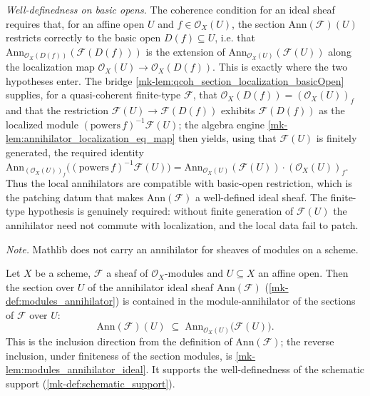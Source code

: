 \begin{definition}
  \emph{Well-definedness on basic opens.} The coherence condition for an ideal
  sheaf requires that, for an affine open \(U\) and \(f \in \mathcal{O}_X(U)\),
  the section \(\mathrm{Ann}(\mathcal{F})(U)\) restricts correctly to the basic
  open \(D(f) \subseteq U\), i.e. that
  \(\mathrm{Ann}_{\mathcal{O}_X(D(f))}(\mathcal{F}(D(f)))\) is the extension of
  \(\mathrm{Ann}_{\mathcal{O}_X(U)}(\mathcal{F}(U))\) along the localization map
  \(\mathcal{O}_X(U) \to \mathcal{O}_X(D(f))\). This is exactly where the two
  hypotheses enter. The bridge
  \ref{mk-lem:qcoh_section_localization_basicOpen} supplies, for a quasi-coherent
  finite-type \(\mathcal{F}\), that \(\mathcal{O}_X(D(f)) = (\mathcal{O}_X(U))_f\)
  and that the restriction \(\mathcal{F}(U) \to \mathcal{F}(D(f))\) exhibits
  \(\mathcal{F}(D(f))\) as the localized module \((\mathrm{powers}\,f)^{-1}
  \mathcal{F}(U)\); the algebra engine
  \ref{mk-lem:annihilator_localization_eq_map} then yields, using that
  \(\mathcal{F}(U)\) is finitely generated, the required identity
  \(\mathrm{Ann}_{(\mathcal{O}_X(U))_f}\bigl((\mathrm{powers}\,f)^{-1}
  \mathcal{F}(U)\bigr) = \mathrm{Ann}_{\mathcal{O}_X(U)}(\mathcal{F}(U)) \cdot
  (\mathcal{O}_X(U))_f\). Thus the local annihilators are compatible with basic-open
  restriction, which is the patching datum that makes \(\mathrm{Ann}(\mathcal{F})\)
  a well-defined ideal sheaf. The finite-type hypothesis is genuinely required:
  without finite generation of \(\mathcal{F}(U)\) the annihilator need not commute
  with localization, and the local data fail to patch.

  \emph{Note.} Mathlib does not carry an annihilator for sheaves of modules on a scheme.
\end{definition}

\begin{lemma}\label{mk-lem:modules_annihilator_ideal_le}
  \leanok

  Let \(X\) be a scheme, \(\mathcal{F}\) a sheaf of \(\mathcal{O}_X\)-modules and
  \(U \subseteq X\) an affine open. Then the section over \(U\) of the annihilator
  ideal sheaf \(\mathrm{Ann}(\mathcal{F})\) (\ref{mk-def:modules_annihilator}) is
  contained in the module-annihilator of the sections of \(\mathcal{F}\) over
  \(U\):
  \[
    \mathrm{Ann}(\mathcal{F})(U)
    \;\subseteq\; \mathrm{Ann}_{\mathcal{O}_X(U)}\bigl(\mathcal{F}(U)\bigr).
  \]
  This is the inclusion direction from the definition of
  \(\mathrm{Ann}(\mathcal{F})\); the reverse inclusion, under finiteness of the
  section modules, is \ref{mk-lem:modules_annihilator_ideal}. It supports the
  well-definedness of the schematic support
  (\ref{mk-def:schematic_support}).
\end{lemma}

